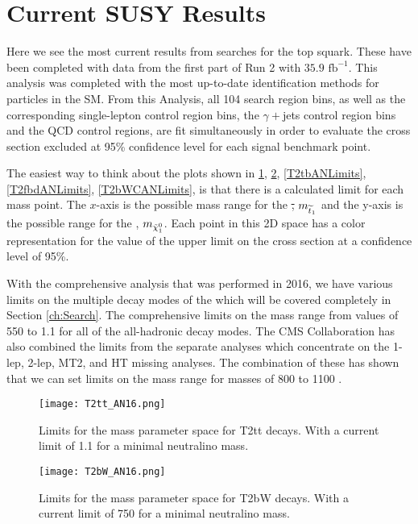 \section{Current SUSY Results}\label{CurrentResults}

Here we see the most current results from searches for the top squark. These have been completed with data from the first part of Run 2 with $35.9 \text{ fb}^{-1}$. This analysis was completed with the most up-to-date identification methods for particles in the SM. From this Analysis, all 104 search region bins, as well as the corresponding single-lepton control region bins, the $\gamma+$jets control region bins and the QCD control regions, are fit simultaneously in order to evaluate the cross section excluded at 95\% confidence level for each signal benchmark point. 

The easiest way to think about the plots shown in \ref{T2ttANLimits}, \ref{T2bWANLimits}, \ref{T2tbANLimits}, \ref{T2fbdANLimits}, \ref{T2bWCANLimits}, is that there is a calculated limit for each mass point. The $x$-axis is the possible mass range for the \st, $m_{\widetilde{t}_1}$ and the y-axis is the possible range for the \neutralino, $m_{\tilde{\chi}^{0}_{1}}$. Each point in this 2D space has a color representation for the value of the upper limit on the cross section at a confidence level of 95\%. 

With the comprehensive analysis that was performed in 2016, we have various limits on the multiple decay modes of the \st{} which will be covered completely in Section \ref{ch:Search}. The comprehensive limits on the \st{} mass range from values of 550 to 1.1 \TeV{} for all of the all-hadronic decay modes. The CMS Collaboration has also combined the limits from the separate analyses which concentrate on the 1-lep, 2-lep, MT2, and HT missing analyses. The combination of these has shown that we can set limits on the \st{} mass range for masses of 800 to 1100 \GeV. 

\begin{figure}
\centering
	\texttt{[image: T2tt\_AN16.png]}
 	\caption[T2tt Limits]{Limits for the mass parameter space for T2tt decays. With a current limit of 1.1 \TeV{} for a minimal neutralino mass.}
 	\label{T2ttANLimits} 
\end{figure}

\begin{figure}
\centering
	\texttt{[image: T2bW\_AN16.png]}
 	\caption[T2bW Limits]{Limits for the mass parameter space for T2bW decays. With a current limit of 750 \GeV{} for a minimal neutralino mass.}
 	\label{T2bWANLimits} 
\end{figure}

